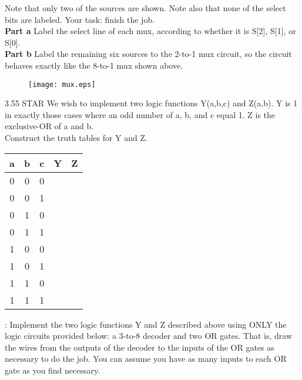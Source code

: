 \documentclass{patt}
\begin{document}
\begin{exercises}
\noindent Note that only two of the sources are shown.  Note also
that none of the select bits are labeled.  Your task: finish the job.\\

{\bf Part a} Label the select line of each mux,
according to whether it is S[2], S[1], or S[0].\\

{\bf Part b} Label the remaining six sources to
the 2-to-1 mux circuit, so the circuit behaves exactly like the 8-to-1
mux shown above.\\

\vspace{0.1in}
\begin{figure}[h]
\centering
\texttt{[image: mux.eps]}
\end{figure}


\item[3.55]STAR We wish to implement two logic functions Y(a,b,c) and Z(a,b).  Y is 1 in exactly those cases where an odd number of a, b, and c equal 1. Z is
the exclusive-OR of a and b.\\

 Construct the truth tables for Y and Z.

\vspace{0.1in}
\begin{center}
\begin{tabular}{ccc||c|c}
    a & b & c & Y & Z \\
    \hline
    0& 0& 0&\ &\\
    0& 0& 1&\ & \\
    0& 1& 0&\ &\\
    0& 1& 1&\ &\\
    1& 0& 0&\ &\\
    1& 0& 1&\ &\\
    1& 1& 0&\ &\\
    1& 1& 1&\ &\\
\end{tabular}
\end{center}

\vspace{0.1in}
 : Implement the two logic functions Y and Z described
above using ONLY the logic circuits provided below: a 3-to-8 decoder and
two OR gates.  That is, draw the wires from the outputs of the decoder
to the inputs of the OR gates as necessary to do the job.  You can assume
you have as many inputs to each OR gate as you find necessary.


\end{exercises}
\end{document}
